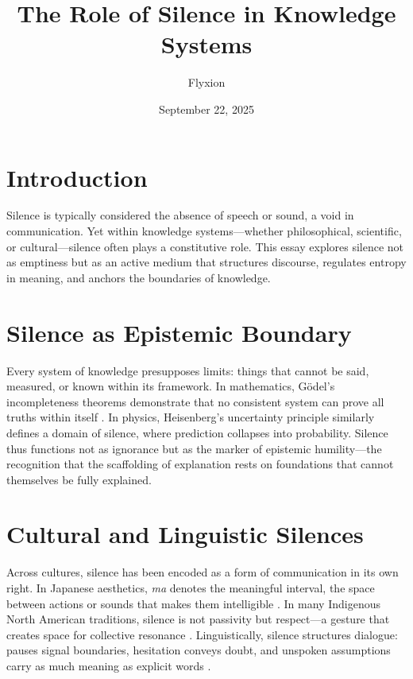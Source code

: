 \documentclass[12pt,a4paper]{article}
\title{The Role of Silence in Knowledge Systems}
\author{Flyxion}
\date{September 22, 2025}
\begin{document}
\maketitle

\section{Introduction}

Silence is typically considered the absence of speech or sound, a void in communication. Yet within knowledge systems—whether philosophical, scientific, or cultural—silence often plays a constitutive role. This essay explores silence not as emptiness but as an active medium that structures discourse, regulates entropy in meaning, and anchors the boundaries of knowledge.

\section{Silence as Epistemic Boundary}

Every system of knowledge presupposes limits: things that cannot be said, measured, or known within its framework. In mathematics, Gödel’s incompleteness theorems demonstrate that no consistent system can prove all truths within itself \citep{Godel1931}. In physics, Heisenberg’s uncertainty principle \citep{Heisenberg1927} similarly defines a domain of silence, where prediction collapses into probability. Silence thus functions not as ignorance but as the marker of epistemic humility—the recognition that the scaffolding of explanation rests on foundations that cannot themselves be fully explained.

\section{Cultural and Linguistic Silences}

Across cultures, silence has been encoded as a form of communication in its own right. In Japanese aesthetics, \emph{ma} denotes the meaningful interval, the space between actions or sounds that makes them intelligible \citep{Isozaki2006}. In many Indigenous North American traditions, silence is not passivity but respect—a gesture that creates space for collective resonance \citep{Basso1970}. Linguistically, silence structures dialogue: pauses signal boundaries, hesitation conveys doubt, and unspoken assumptions carry as much meaning as explicit words \citep{Jaworski1993}.
\end{document}
